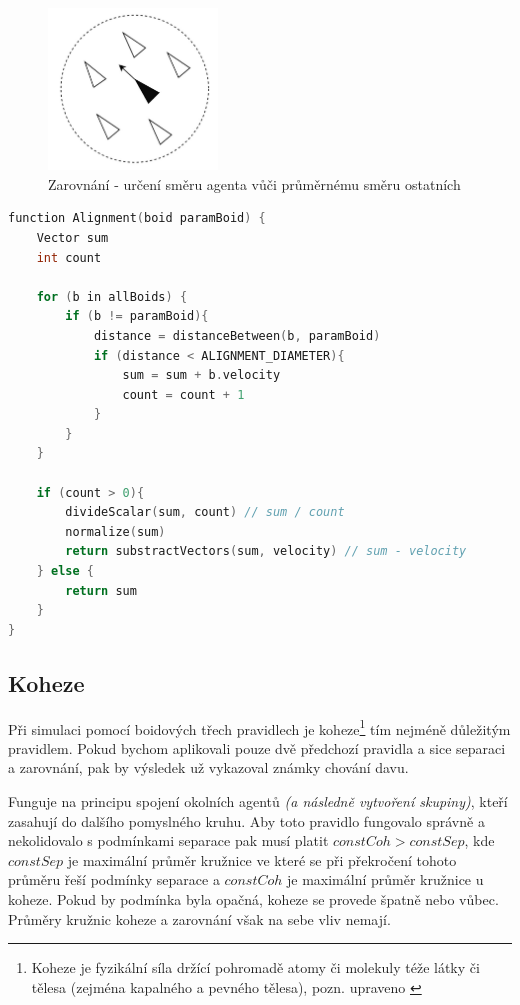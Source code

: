 \documentclass[czech,public,dept460,male,cpdeclaration]{diploma}
\begin{document}
\begin{figure}[H]\centering\includegraphics[width=0.4\textwidth]{Figures/alignment2.jpg}
	\caption{Zarovnání - určení směru agenta vůči průměrnému směru ostatních} \label{fig:zarovnani}
\end{figure}

\begin{lstlisting}[language=C++,label=src:Alignment pseudocode,caption=Pseudokód pro zarovnání]
function Alignment(boid paramBoid) {
	Vector sum
	int count
	
	for (b in allBoids) {
		if (b != paramBoid){
			distance = distanceBetween(b, paramBoid)
			if (distance < ALIGNMENT_DIAMETER){
				sum = sum + b.velocity
				count = count + 1
			}
		}
	}
	
	if (count > 0){
		divideScalar(sum, count) // sum / count
		normalize(sum)
		return substractVectors(sum, velocity) // sum - velocity
	} else {
		return sum
	}
}
\end{lstlisting}

\subsection{Koheze}\label{sec:koheze}
Při simulaci pomocí boidových třech pravidlech je koheze\footnote{Koheze je fyzikální síla držící pohromadě atomy či molekuly téže látky či tělesa (zejména
	kapalného a pevného tělesa), pozn. upraveno \cite{linkToCohesion}} tím nejméně důležitým pravidlem. Pokud bychom aplikovali pouze dvě předchozí pravidla a sice separaci a zarovnání, pak by výsledek už vykazoval známky chování davu.

Funguje na principu spojení okolních agentů \textit{(a následně vytvoření skupiny)}, kteří zasahují do dalšího pomyslného kruhu. Aby toto pravidlo fungovalo správně a nekolidovalo s podmínkami separace pak musí platit \(constCoh > constSep\), kde \(constSep\) je maximální průměr kružnice ve které se při překročení tohoto průměru řeší podmínky separace a \(constCoh\) je maximální průměr kružnice u koheze. Pokud by podmínka byla opačná, koheze se provede špatně nebo vůbec. Průměry kružnic koheze a zarovnání však na sebe vliv nemají.
\end{document}
